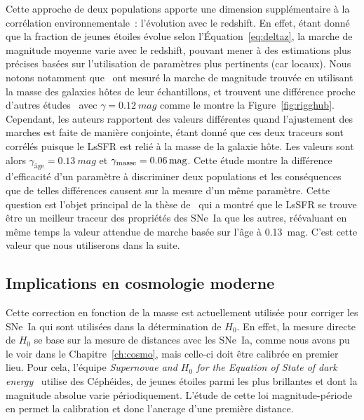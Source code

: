\documentclass[../main/main.tex]{subfiles}
\begin{document}
Cette approche de deux populations apporte une dimension supplémentaire à la
corrélation environnementale~: l'évolution avec le redshift. En effet, étant
donné que la fraction de jeunes étoiles évolue selon l'Équation~\ref{eq:deltaz},
la marche de magnitude moyenne varie avec le redshift, pouvant mener à des
estimations plus précises basées sur l'utilisation de paramètres plus pertinents
(car locaux). Nous notons notamment que~\cite{rigault2020} ont mesuré la marche
de magnitude trouvée en utilisant la masse des galaxies hôtes de leur
échantillons, et trouvent une différence proche d'autres
études~\citep{kelly2010, sullivan2010, gupta2011, childress2013} avec $\gamma =
\SI{0.12}{mag}$ comme le montre la Figure~\ref{fig:rigghub}. Cependant, les
auteurs rapportent des valeurs différentes quand l'ajustement des marches est
faite de manière conjointe, étant donné que ces deux traceurs sont corrélés
puisque le LsSFR est relié à la masse de la galaxie hôte. Les valeurs sont alors
$\gamma_\text{âge} = \SI{0.13}{mag}$ et $\gamma_{\rm masse} = \SI{0.06}{mag}$.
Cette étude montre la différence d'efficacité d'un paramètre à discriminer deux
populations et les conséquences que de telles différences causent sur la mesure
d'un même paramètre. Cette question est l'objet principal de la thèse
de~\cite{briday2021} qui a montré que le LsSFR se trouve être un meilleur
traceur des propriétés des SNe~Ia que les autres, réévaluant en même temps la
valeur attendue de marche basée sur l'âge à \SI{0.13}{mag}. C'est cette valeur
que nous utiliserons dans la suite.

\subsection{Implications en cosmologie moderne}\label{ssec:mcosmo}

Cette correction en fonction de la masse est actuellement utilisée pour corriger
les SNe~Ia qui sont utilisées dans la détermination de $H_0$. En effet, la
mesure directe de $H_0$ se base sur la mesure de distances avec les SNe~Ia,
comme nous avons pu le voir dans le Chapitre~\ref{ch:cosmo}, mais celle-ci doit
être calibrée en premier lieu. Pour cela, l'équipe \textit{Supernovae and
$H_0$ for the Equation of State of dark energy}~\citep[SH0ES,
Supernovae et $H_0$ pour l'équation d'état de l'énergie sombre,][]{riess2021}
utilise des Céphéides, de jeunes étoiles parmi les plus brillantes et dont la
magnitude absolue varie périodiquement. L'étude de cette loi magnitude-période
en permet la calibration et donc l'ancrage d'une première distance.
\end{document}
